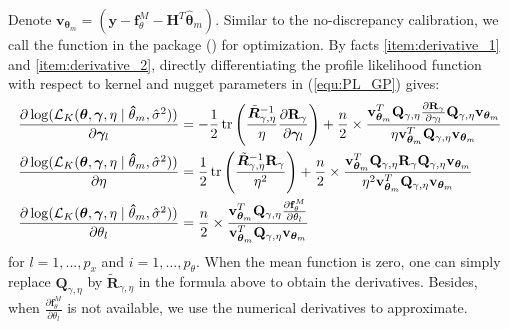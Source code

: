 Denote $\mathbf v_{\bm \theta_m}=(\mathbf{y}-\mathbf f^M_{\theta}- \mathbf H^T \hat{\bm \theta}_m  )$.  Similar to the no-discrepancy calibration, we call the  function in the  package (\cite{nloptr2014}) for optimization. 
By facts \ref{item:derivative_1} and \ref{item:derivative_2}, directly differentiating the profile likelihood  function with respect to kernel and nugget parameters in (\ref{equ:PL_GP}) gives:  
\begin{align*}
\frac{\partial \log( \mathcal L_K( \bm \theta, \bm \gamma, \eta \mid {\bm \hat \theta_m}, \hat \sigma^2 ) )}{ \partial \bm \gamma_l } &= -\frac{1}{2}\tr\left( \frac{\tilde {\bm R}_{\gamma,\eta}^{-1}}{\eta} \frac{\partial \mathbf R_\gamma}{\partial \bm \gamma_l} \right)  +\frac{n}{2}\times \frac{ \mathbf v_{\bm \theta_m}^T   \mathbf Q_{\gamma,\eta} \frac{\partial \mathbf R_\gamma}{\partial  \gamma_l} \mathbf Q_{\gamma,\eta} \mathbf v_{\bm \theta_m} }{\eta \mathbf v_{\bm \theta_m}^T \mathbf Q_{\gamma,\eta} \mathbf v_{\bm \theta_m} } \\
\frac{\partial \log( \mathcal L_K( \bm \theta, \bm \gamma, \eta \mid {\bm \hat \theta_m}, \hat \sigma^2 ) )}{ \partial \eta } &= \frac{1}{2}\tr\left( \frac{\tilde {\bm R}_{\gamma,\eta}^{-1} \mathbf R_\gamma}{\eta^2} \right) +\frac{n}{2}\times \frac{ \mathbf v_{\bm \theta_m}^T   \mathbf Q_{\gamma,\eta} \mathbf R_{\gamma}  \mathbf Q_{\gamma,\eta} \mathbf v_{\bm \theta_m} }{\eta^2 \mathbf v_{\bm \theta_m}^T \mathbf Q_{\gamma,\eta} \mathbf v_{\bm \theta_m} } \\
\frac{\partial \log( \mathcal L_K( \bm \theta, \bm \gamma, \eta \mid {\bm \hat \theta_m}, \hat \sigma^2 ) )}{ \partial \theta_l }  &= \frac{n}{2}\times \frac{  \mathbf v_{\bm \theta_m}^T  \mathbf Q_{\gamma,\eta} \frac{\partial \mathbf f^M_\theta}{\partial \theta_l}}{ \mathbf v_{\bm \theta_m}^T   \mathbf Q_{\gamma,\eta}  \mathbf v_{\bm \theta_m} } %
\label{equ:PL}
\end{align*}
for $l=1,...,p_x$ and $i=1,...,p_{\theta}$. When the mean function is zero, one can simply replace $\mathbf Q_{\gamma,\eta}$ by $\tilde {\bm R}_{\gamma,\eta}$ in the formula above to obtain the derivatives.  Besides, when $\frac{\partial \mathbf f^M_\theta}{\partial \theta_l}$ is not available, we use the numerical derivatives to approximate. 


